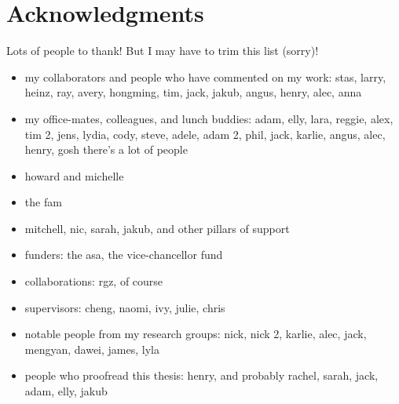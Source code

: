 \chapter*{Acknowledgments}

Lots of people to thank! But I may have to trim this list (sorry)!

\begin{itemize}
    \item my collaborators and people who have commented on my work: stas, larry, heinz, ray, avery, hongming, tim, jack, jakub, angus, henry, alec, anna
    \item my office-mates, colleagues, and lunch buddies: adam, elly, lara, reggie, alex, tim 2, jens, lydia, cody, steve, adele, adam 2, phil, jack, karlie, angus, alec, henry, gosh there's a lot of people
    \item howard and michelle
    \item the fam
    \item mitchell, nic, sarah, jakub, and other pillars of support
    \item funders: the asa, the vice-chancellor fund
    \item collaborations: rgz, of course
    \item supervisors: cheng, naomi, ivy, julie, chris
    \item notable people from my research groups: nick, nick 2, karlie, alec, jack, mengyan, dawei, james, lyla
    \item people who proofread this thesis: henry, and probably rachel, sarah, jack, adam, elly, jakub
\end{itemize}
